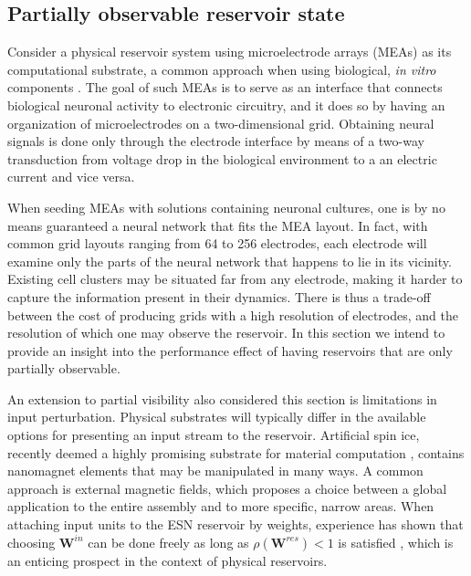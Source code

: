\subsection{Partially observable reservoir state}

Consider a physical reservoir system using microelectrode arrays (MEAs) as its
computational substrate, a common approach when using biological, \textit{in
vitro} components \cite{aaser_towards_2017}. The goal of such MEAs is to serve
as an interface that connects biological neuronal activity to electronic
circuitry, and it does so by having an organization of microelectrodes on a
two-dimensional grid. Obtaining neural signals is done only through the
electrode interface by means of a two-way transduction from voltage drop in the
biological environment to a an electric current and vice versa.

When seeding MEAs with solutions containing neuronal cultures, one is by no
means guaranteed a neural network that fits the MEA layout. In fact, with common
grid layouts ranging from 64 to 256 electrodes, each electrode will examine only
the parts of the neural network that happens to lie in its vicinity. Existing
cell clusters may be situated far from any electrode, making it harder to
capture the information present in their dynamics. There is thus a trade-off
between the cost of producing grids with a high resolution of electrodes, and
the resolution of which one may observe the reservoir. In this section we intend
to provide an insight into the performance effect of having reservoirs that are
only partially observable.

An extension to partial visibility also considered this section is limitations
in input perturbation. Physical substrates will typically differ in the
available options for presenting an input stream to the reservoir. Artificial
spin ice, recently deemed a highly promising substrate for material computation
\cite{jensen_computation_2018}, contains nanomagnet elements that may be
manipulated in many ways. A common approach is external magnetic fields, which
proposes a choice between a global application to the entire assembly and to
more specific, narrow areas. When attaching input units to the ESN reservoir by
weights, experience has shown that choosing $\mathbf{W}^{in}$ can be done freely
as long as $\rho(\mathbf{W}^{res}) < 1$ is satisfied \cite{jaeger_echo_2001},
which is an enticing prospect in the context of physical reservoirs.

